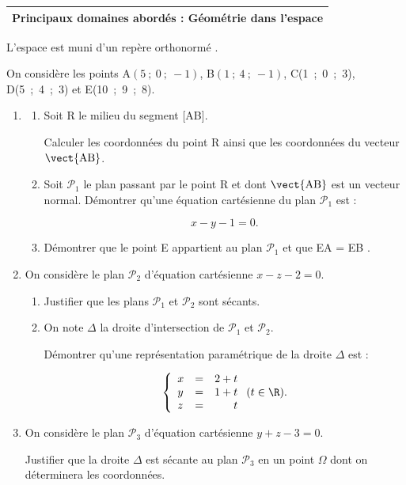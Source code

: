 \medskip

\begin{tabularx}{\linewidth}{|X|}\hline
\textbf{Principaux domaines abordés :} Géométrie dans l'espace\\ \hline
\end{tabularx}

\medskip

L'espace est muni d'un repère orthonormé \Oijk.

On considère les points A$(5~;~0~;~-1)$, B$(1~;~4~;~-1)$, C(1~;~0~;~3), D(5~;~4~;~3) et E(10~;~9~;~8).

\medskip

\begin{enumerate}
\item 
	\begin{enumerate}
		\item Soit R le milieu du segment [AB].
		
Calculer les coordonnées du point R ainsi que les coordonnées du vecteur $\vect{\text{AB}}$.
		\item Soit $\mathcal{P}_1$ le plan passant par le point R et dont $\vect{\text{AB}}$ est un vecteur normal. Démontrer qu'une équation cartésienne du plan $\mathcal{P}_1$ est :

\[x - y - 1 = 0.\]

		\item Démontrer que le point E appartient au plan $\mathcal{P}_1$ et que EA = EB .
	\end{enumerate}	
\item  On considère le plan $\mathcal{P}_2$ d'équation cartésienne $x - z - 2 = 0$. 
	\begin{enumerate}
		\item Justifier que les plans $\mathcal{P}_1$ et $\mathcal{P}_2$ sont sécants.
		\item On note $\Delta$ la droite d'intersection de $\mathcal{P}_1$ et $\mathcal{P}_2$.
		
Démontrer qu'une représentation paramétrique de la droite $\Delta$ est :

\[\left\{\begin{array}{l c r}
x&=&2+t\\
y&=&1+t \\
z&=&t\end{array}\right.(t \in \R).\]

	\end{enumerate}
\item  On considère le plan $\mathcal{P}_3$ d'équation cartésienne $y + z - 3 = 0$.

Justifier que la droite $\Delta$ est sécante au plan $\mathcal{P}_3$ en un point $\Omega$ dont on déterminera les coordonnées.
\end{enumerate}

